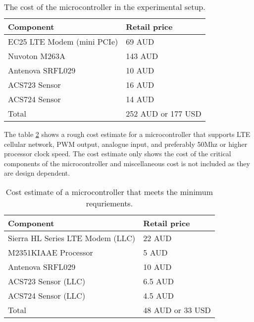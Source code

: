 \documentclass[../thesis.tex]{subfiles}
\begin{document}
\begin{table}[h!]
\begin{center}
\caption{The cost of the microcontroller in the experimental setup.}
\label{tab:mcestimateexp}
\begin{tabular}{l|l}
\toprule
\textbf{Component} & \textbf{Retail price}\\
\midrule
EC25 LTE Modem (mini PCIe) & 69 AUD\\
Nuvoton M263A & 143 AUD\\
Antenova SRFL029 & 10 AUD\\
ACS723 Sensor & 16 AUD\\
ACS724 Sensor & 14 AUD\\
\midrule
Total & 252 AUD or 177 USD\\
\bottomrule
\end{tabular}
\end{center}
\end{table}

The table \ref{tab:mcestimate} shows a rough cost estimate for a microcontroller that supports LTE cellular network, PWM output, analogue input, and preferably 50Mhz or higher processor clock speed. The cost estimate only shows the cost of the critical components of the microcontroller and miscellaneous cost is not included as they are design dependent.

\begin{table}[h!]
\begin{center}
\caption{Cost estimate of a microcontroller that meets the minimum requriements.}
\label{tab:mcestimate}
\begin{tabular}{l|l}
\toprule
\textbf{Component} & \textbf{Retail price}\\
\midrule
Sierra HL Series LTE Modem (LLC) & 22 AUD\\
M2351KIAAE Processor & 5 AUD\\
Antenova SRFL029 & 10 AUD\\
ACS723 Sensor (LLC) & 6.5 AUD\\
ACS724 Sensor (LLC) & 4.5 AUD\\
\midrule
Total & 48 AUD or 33 USD\\
\bottomrule
\end{tabular}
\end{center}
\end{table}
\end{document}
